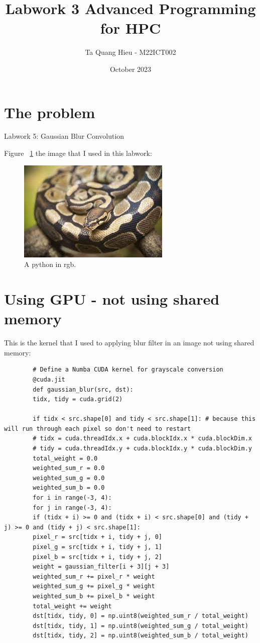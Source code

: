 \documentclass{article}
\title{Labwork 3 Advanced Programming for HPC}
\author{Ta Quang Hieu - M22ICT002}
\date{October 2023}
\begin{document}
	
	\maketitle
	
	\section{The problem}
	Labwork 5: Gaussian Blur Convolution
	
	Figure ~\ref{fig:python} the image that I used in this labwork:
	
	\begin{figure}
		\includegraphics[width=\linewidth]{python.jpg}
		\caption{A python in rgb.}
		\label{fig:python}
	\end{figure}
	
	\section{Using GPU - not using shared memory}
	This is the kernel that I used to applying blur filter in an image not using shared memory:
	\begin{verbatim}
		# Define a Numba CUDA kernel for grayscale conversion
		@cuda.jit
		def gaussian_blur(src, dst):
		tidx, tidy = cuda.grid(2)
		
		if tidx < src.shape[0] and tidy < src.shape[1]: # because this will run through each pixel so don't need to restart
		# tidx = cuda.threadIdx.x + cuda.blockIdx.x * cuda.blockDim.x
		# tidy = cuda.threadIdx.y + cuda.blockIdx.y * cuda.blockDim.y
		total_weight = 0.0
		weighted_sum_r = 0.0
		weighted_sum_g = 0.0
		weighted_sum_b = 0.0
		for i in range(-3, 4):
		for j in range(-3, 4):
		if (tidx + i) >= 0 and (tidx + i) < src.shape[0] and (tidy + j) >= 0 and (tidy + j) < src.shape[1]:
		pixel_r = src[tidx + i, tidy + j, 0]
		pixel_g = src[tidx + i, tidy + j, 1]
		pixel_b = src[tidx + i, tidy + j, 2]
		weight = gaussian_filter[i + 3][j + 3]
		weighted_sum_r += pixel_r * weight
		weighted_sum_g += pixel_g * weight
		weighted_sum_b += pixel_b * weight
		total_weight += weight
		dst[tidx, tidy, 0] = np.uint8(weighted_sum_r / total_weight)
		dst[tidx, tidy, 1] = np.uint8(weighted_sum_g / total_weight)
		dst[tidx, tidy, 2] = np.uint8(weighted_sum_b / total_weight)
	\end{verbatim}
	
\end{document}
